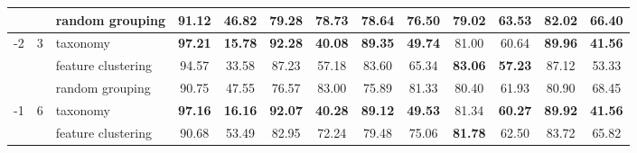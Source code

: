\documentclass[final]{cvpr}
\begin{document}
\begin{table*}[t]
{\begin{tabular}{c|c|l|cc|cc|cc|cc|cc}
                                &                                                                                        & random grouping                                                                                             & 91.12                & 46.82                 & 79.28                & 78.73                 & 78.64                & 76.50                 & 79.02                & 63.53                 & 82.02                & 66.40                \\ \midrule
\multirow{3}{*}{-2}             & \multirow{3}{*}{3}                                                                     & taxonomy                                                                                                    & \textbf{97.21}       & \textbf{15.78}        & \textbf{92.28}       & \textbf{40.08}        & \textbf{89.35}       & \textbf{49.74}        & 81.00                & 60.64                 & \textbf{89.96}       & \textbf{41.56}       \\
                                &                                                                                        & feature clustering                                                                                          & 94.57                & 33.58                 & 87.23                & 57.18                 & 83.60                & 65.34                 & \textbf{83.06}       & \textbf{57.23}        & 87.12                & 53.33                \\
                                &                                                                                        & random grouping                                                                                             & 90.75                & 47.55                 & 76.57                & 83.00                 & 75.89                & 81.33                 & 80.40                & 61.93                 & 80.90                & 68.45                \\ \midrule
\multirow{3}{*}{-1}             & \multirow{3}{*}{6}                                                                     & taxonomy                                                                                                    & \textbf{97.16}       & \textbf{16.16}        & \textbf{92.07}       & \textbf{40.28}        & \textbf{89.12}       & \textbf{49.53}        & 81.34                & \textbf{60.27}        & \textbf{89.92}       & \textbf{41.56}       \\
                                &                                                                                        & feature clustering                                                                                          & 90.68                & 53.49                 & 82.95                & 72.24                 & 79.48                & 75.06                 & \textbf{81.78}       & 62.50                 & 83.72                & 65.82                \\

\end{tabular}}
\end{table*}
\end{document}
